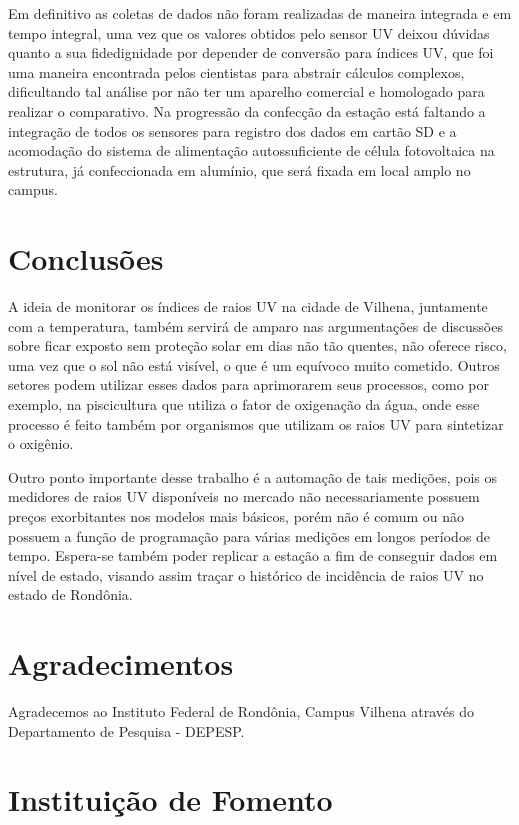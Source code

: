 \documentclass[article,12pt,onesidea,4paper,english,brazil]{abntex2}
\begin{document}
	Em definitivo as coletas de dados não foram realizadas de maneira integrada e em tempo integral, uma vez que os valores obtidos pelo sensor UV deixou dúvidas quanto a sua fidedignidade por depender de conversão para índices UV, que foi uma maneira encontrada pelos cientistas para abstrair cálculos complexos, dificultando tal análise por não ter um aparelho comercial e homologado para realizar o comparativo. Na progressão da confecção da estação está faltando a integração de todos os sensores para registro dos dados em cartão SD e a acomodação do sistema de alimentação autossuficiente de célula fotovoltaica na estrutura, já confeccionada em alumínio, que será fixada em local amplo no campus.
	
	\section*{Conclusões}
	
	A ideia de monitorar os índices de raios UV na cidade de Vilhena, juntamente com a temperatura, também servirá de amparo nas argumentações de discussões sobre ficar exposto sem proteção solar em dias não tão quentes, não oferece risco, uma vez que o sol não está visível, o que é um equívoco muito cometido. Outros setores podem utilizar esses dados para aprimorarem seus processos, como por exemplo, na piscicultura que utiliza o fator de oxigenação da água, onde esse processo é feito também por organismos que utilizam os raios UV para sintetizar o oxigênio.
	
	Outro ponto importante desse trabalho é a automação de tais medições, pois os medidores de raios UV disponíveis no mercado não necessariamente possuem preços exorbitantes nos modelos mais básicos, porém não é comum ou não possuem a função de programação para várias medições em longos períodos de tempo. Espera-se também poder replicar a estação a fim de conseguir dados em nível de estado, visando assim traçar o histórico de incidência de raios UV no estado de Rondônia.
	
	\section*{Agradecimentos}
	Agradecemos ao Instituto Federal de Rondônia, Campus Vilhena através do Departamento de Pesquisa - DEPESP.
	
	\section*{Instituição de Fomento}
	
\end{document}
